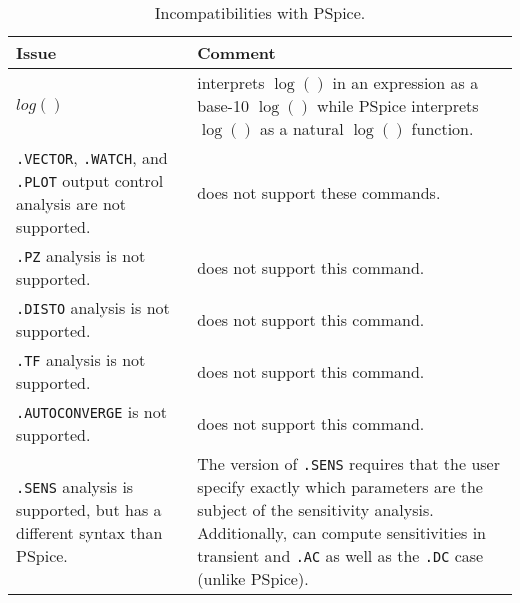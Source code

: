 



\begin{longtable}[h] {>{\raggedright\small}m{2in}|>{\raggedright\let\\\tabularnewline\small}m{4in}}
  \caption{Incompatibilities with PSpice.} \\ \hline
  \rowcolor{XyceDarkBlue}
  \color{white}\bf Issue & 
  \color{white}\bf Comment \\ \hline \endfirsthead
  \label{Incompat_PS}
  
\texttt{$log()$} & \Xyce{} interprets $\log()$ in an expression as a base-10 $\log()$ 
  while PSpice interprets $\log()$ as a natural $\log()$ function. \\ \hline

\texttt{.VECTOR}, \texttt{.WATCH}, and \texttt{.PLOT}  output 
control analysis are not supported. & \Xyce{} does 
not support these commands.  \\ \hline


\texttt{.PZ} analysis is not supported. & \Xyce{} does not support this command.  
\\ \hline


\texttt{.DISTO} analysis is not supported. & \Xyce{} does not support this command.  
\\ \hline

\texttt{.TF} analysis is not supported. & \Xyce{} does not support this command.  
\\ \hline

\texttt{.AUTOCONVERGE} is not supported. & \Xyce{} does not support this command.  
\\ \hline

\texttt{.SENS} analysis is supported, but has a different syntax than PSpice. & The \Xyce{} version of \texttt{.SENS} requires that the user specify exactly which parameters are the subject of the sensitivity analysis.  Additionally, \Xyce{} can compute sensitivities in transient and \texttt{.AC} as well as the \texttt{.DC} case (unlike PSpice).
\\ \hline


\end{longtable}
